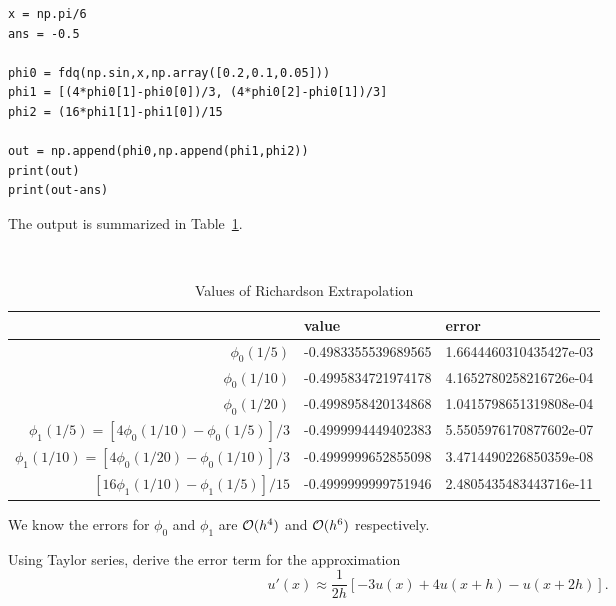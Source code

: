 \documentclass[10pt]{article}
\begin{document}
\begin{solution}[Solution]
\begin{lstlisting}
x = np.pi/6
ans = -0.5

phi0 = fdq(np.sin,x,np.array([0.2,0.1,0.05]))
phi1 = [(4*phi0[1]-phi0[0])/3, (4*phi0[2]-phi0[1])/3]
phi2 = (16*phi1[1]-phi1[0])/15

out = np.append(phi0,np.append(phi1,phi2))
print(out)
print(out-ans)
\end{lstlisting}

The output is summarized in Table~\ref{richardson}.

    \begin{table}[H]\centering \tt
\begin{tabular}{|r|l|l|} \hline
    & {\rm value} & {\rm error } \\ \hline
    \( \phi_0(1/5) \) & -0.4983355539689565 & 1.6644460310435427e-03 \\
    \( \phi_0(1/10) \) & -0.4995834721974178 & 4.1652780258216726e-04 \\
    \( \phi_0(1/20) \) & -0.4998958420134868 & 1.0415798651319808e-04\\ \hline
    \( \phi_1(1/5) = [4\phi_0(1/10)-\phi_0(1/5)]/3 \) & -0.4999994449402383 &  5.5505976170877602e-07\\ 
    \( \phi_1(1/10) = [4\phi_0(1/20)-\phi_0(1/10)]/3 \) & -0.4999999652855098 & 3.4714490226850359e-08\\ \hline
    \( [16\phi_1(1/10)-\phi_1(1/5)]/15 \) & -0.4999999999751946 & 2.4805435483443716e-11 \\\hline
\end{tabular}
    \caption{Values of Richardson Extrapolation}
    \label{richardson}
\end{table}

We know the errors for \( \phi_0 \) and \( \phi_1 \) are \( \mathcal{O}(h^4) \) and \( \mathcal{O}(h^6) \) respectively.
\end{solution}


\begin{problem}[Problem 3]
Using Taylor series, derive the error term for the approximation
\[ u' (x) \approx \frac{1}{2h} [ -3 u(x) + 4 u(x+h) - u(x+2h) ] .\]
\end{problem}
\end{document}
